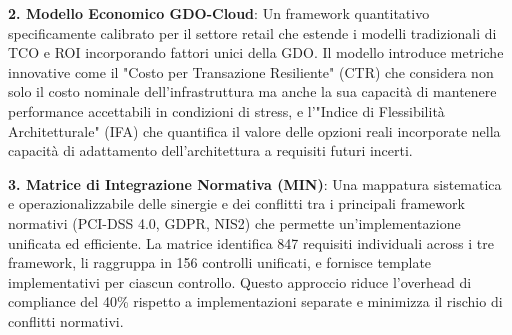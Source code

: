 \textbf{2. Modello Economico GDO-Cloud}: Un framework quantitativo specificamente calibrato per il settore retail che estende i modelli tradizionali di TCO e ROI incorporando fattori unici della GDO. Il modello introduce metriche innovative come il "Costo per Transazione Resiliente" (CTR) che considera non solo il costo nominale dell'infrastruttura ma anche la sua capacità di mantenere performance accettabili in condizioni di stress, e l'"Indice di Flessibilità Architetturale" (IFA) che quantifica il valore delle opzioni reali incorporate nella capacità di adattamento dell'architettura a requisiti futuri incerti.

\textbf{3. Matrice di Integrazione Normativa (MIN)}: Una mappatura sistematica e operazionalizzabile delle sinergie e dei conflitti tra i principali framework normativi (PCI-DSS 4.0, GDPR, NIS2) che permette un'implementazione unificata ed efficiente. La matrice identifica 847 requisiti individuali across i tre framework, li raggruppa in 156 controlli unificati, e fornisce template implementativi per ciascun controllo. Questo approccio riduce l'overhead di compliance del 40\% rispetto a implementazioni separate e minimizza il rischio di conflitti normativi.

